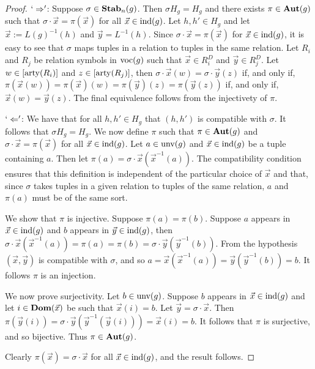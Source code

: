 \documentclass[../paper.tex]{subfiles}
\begin{document}
\begin{proof}
  $`\Rightarrow'$: Suppose $\sigma \in \text{\textbf{Stab}}_n(g)$. Then $\sigma H_g = H_g$ and
  there exists $\pi \in \text{\textbf{Aut}}(g)$ such that $\sigma \cdot \vec{x} = \pi
  (\vec{x})$ for all $\vec{x} \in \text{\upshape ind}(g)$. Let $h, h' \in H_g$ and let $\vec{x}
  := L(g)^{-1}(h)$ and $\vec{y} = L^{-1}(h)$. Since $\sigma \cdot \vec{x} = \pi
  (\vec{x})$ for $\vec{x} \in \text{\upshape ind}(g)$, it is easy to see that $\sigma$ maps
  tuples in a relation to tuples in the same relation. Let $R_i$ and $R_j$ be
  relation symbols in $\text{voc}(g)$ such that $\vec{x} \in R^D_i$ and $\vec{y} \in
  R^D_j$. Let $w \in [\mathrm{arty} (R_i)]$ and $z \in [\mathrm{arty} (R_j)]$, then $\sigma
  \cdot \vec{x} (w) = \sigma \cdot \vec{y}(z)$ if, and only if, $\pi(\vec{x}(w))
  = \pi (\vec{x})(w) = \pi (\vec{y})(z) = \pi(\vec{y}(z))$ if, and only if,
  $\vec{x}(w) = \vec{y}(z)$. The final equivalence follows from the injectivety
  of $\pi$.
  
  $`\Leftarrow'$: We have that for all $h, h' \in H_g$ that $(h, h')$ is
  compatible with $\sigma$. It follows that $\sigma H_g = H_g$. We now define
  $\pi$ such that $\pi \in \text{\textbf{Aut}}(g)$ and $\sigma \cdot \vec{x} = \pi (\vec{x})$
  for all $\vec{x} \in \text{\upshape ind}(g)$. Let $a \in \text{unv}(g)$ and $\vec{x} \in
  \text{\upshape ind}(g)$ be a tuple containing $a$. Then let $\pi (a) = \sigma \cdot \vec{x}
  (\vec{x}^{-1}(a))$. The compatibility condition ensures that this definition
  is independent of the particular choice of $\vec{x}$ and that, since $\sigma$
  takes tuples in a given relation to tuples of the same relation, $a$ and $\pi
  (a)$ must be of the same sort.
  
  We show that $\pi$ is injective. Suppose $\pi(a) = \pi(b)$. Suppose $a$
  appears in $\vec{x} \in \text{\upshape ind}(g)$ and $b$ appears in $\vec{y} \in \text{\upshape ind}(g)$,
  then $\sigma \cdot \vec{x} (\vec{x}^{-1}(a)) = \pi (a) = \pi(b) = \sigma \cdot
  \vec{y}(\vec{y}^{-1}(b))$. From the hypothesis $(\vec{x}, \vec{y})$ is
  compatible with $\sigma$, and so $a = \vec{x}(\vec{x}^{-1}(a)) =
  \vec{y}(\vec{y}^{-1}(b)) = b$. It follows $\pi$ is an injection.
  
  We now prove surjectivity. Let $b \in \text{unv}(g)$. Suppose $b$ appears in
  $\vec{x} \in \text{\upshape ind}(g)$ and let $i \in \text{\textbf{Dom}}(\vec{x})$ be such that $\vec{x}(i) =
  b$. Let $\vec{y} = \sigma \cdot \vec{x}$. Then $\pi (\vec{y}(i)) = \sigma
  \cdot \vec{y} (\vec{y}^{-1}(\vec{y}(i))) = \vec{x}(i) = b$. It follows that
  $\pi$ is surjective, and so bijective. Thus $\pi \in \text{\textbf{Aut}}(g)$.

  Clearly $\pi (\vec{x}) = \sigma \cdot \vec{x}$ for all $\vec{x} \in \text{\upshape ind}(g)$,
  and the result follows.
\end{proof}
\end{document}
